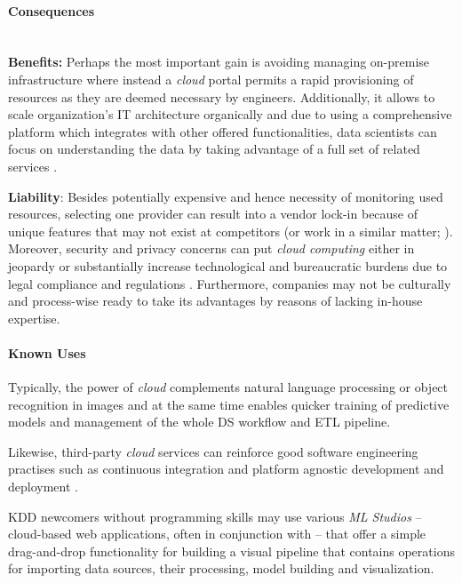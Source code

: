 \paragraph*{Consequences} ~\\
{\hspace*{14.5pt} \textbf{Benefits:} \hspace*{-5.5pt} }
Perhaps the most important gain is avoiding managing on-premise infrastructure where instead a \emph{cloud} portal permits a rapid provisioning of resources as they are deemed necessary by engineers.
Additionally, it allows to scale organization's \ac{IT} architecture organically and due to using a comprehensive platform which integrates with other offered functionalities, data scientists can focus on understanding the data by taking advantage of a full set of related services \parencites{DJ2013}{Fern2016}.

\textbf{Liability}:
Besides potentially expensive and hence necessity of monitoring used resources, selecting one provider can result into a vendor lock-in because of unique features that may not exist at competitors (or work in a similar matter; \cite{JusticeMartinis2015Cloud}). 
Moreover, security and privacy concerns can put \emph{cloud computing} either in jeopardy or substantially increase technological and bureaucratic burdens due to legal compliance and regulations \parencite{StoneAdamPrivSecCloud2010}.
Furthermore, companies may not be culturally and process-wise ready to take its advantages by reasons of lacking in-house expertise.

\paragraph*{Known Uses}
\begin{compactitem}
  \item Typically, the power of \emph{cloud} complements natural language processing or object recognition in images and at the same time enables quicker training of predictive models and management of the whole \ac{DS} workflow and \ac{ETL} pipeline.
  \item Likewise, third-party \emph{cloud} services can reinforce good software engineering practises such as continuous integration and platform agnostic development and deployment \parencite{GuhaSEngCloud2010}. 
  \item \ac{KDD} newcomers without programming skills may use various \emph{\ac{ML} Studios} -- cloud-based web applications, often in conjunction with  -- that offer a simple drag-and-drop functionality for building a visual pipeline that contains operations for importing data sources, their processing, model building and visualization.
\end{compactitem}

